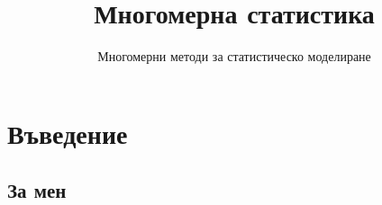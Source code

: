 \documentclass[8pt,t,aspectratio=169]{beamer}
\title{Многомерна статистика}
\subtitle{Многомерни методи за статистическо моделиране}
\date{}
\begin{document}
\setcounter{section}{-1}

\begin{frame}[c]
    \titlepage
\end{frame}


\section{Въведение}
\subsection{За мен}

\end{document}
